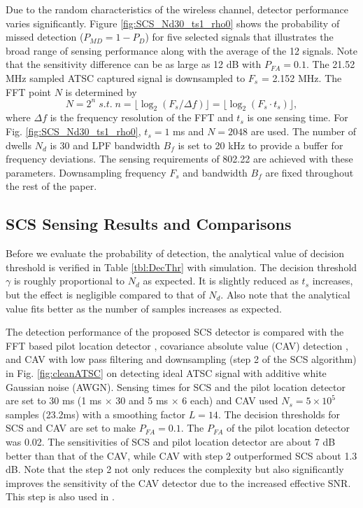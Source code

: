 \documentclass[draftclsnofoot,onecolumn,12pt]{IEEEtran}
\begin{document}
Due to the random
characteristics of the wireless channel, detector performance varies significantly.
Figure \ref{fig:SCS_Nd30_ts1_rho0} shows the probability of missed detection ($P_{MD} = 1 - P_D$) for five selected signals that illustrates the broad range of sensing performance along with the average of the 12 signals.
Note that the sensitivity difference
can be as large as 12 dB with $P_{FA} = 0.1$. The 21.52 MHz sampled ATSC captured signal is
downsampled to $F_s$ = 2.152 MHz. The FFT point $N$ is determined by
\begin{equation}
    N = 2^n \; s.t. \; n = \lfloor \log_2 (F_s/\Delta f) \rfloor = \lfloor \log_2 (F_s \cdot t_s)
    \rfloor, \label{eq:N}
\end{equation}
where $\Delta f$ is the frequency resolution of the FFT and $t_s$ is one sensing time.
For Fig.  \ref{fig:SCS_Nd30_ts1_rho0}, $t_s = 1$ ms and $N = 2048$ are used. The number of dwells $N_d$ is 30 and LPF bandwidth $B_f$ is set to 20 kHz to provide a buffer for
frequency deviations. The sensing requirements of 802.22 are achieved with these parameters.
Downsampling frequency $F_s$ and bandwidth $B_f$ are fixed throughout the rest of the paper.

\subsection{SCS Sensing Results and Comparisons}
\label{subsec:SimResults}


Before we evaluate the probability of detection, the analytical value of decision threshold is verified in Table \ref{tbl:DecThr} with simulation.
The decision threshold $\gamma$ is roughly proportional to $N_d$ as expected. It is slightly reduced as $t_s$ increases, but the effect is negligible compared to that of $N_d$. Also note that the analytical value fits better as the number of samples increases as expected.

The detection performance of the proposed SCS detector is compared with the FFT based pilot location detector \cite{CorGho07}, covariance absolute value (CAV) detection \cite{ZenLia09}, and CAV with low pass filtering and downsampling (step 2 of the SCS algorithm) in Fig. \ref{fig:cleanATSC} on detecting ideal ATSC signal with additive white Gaussian noise (AWGN). Sensing times for SCS and the pilot location detector are set to 30 ms (1 ms $\times$ 30 and 5 ms $\times$ 6 each) and CAV used  $N_s = 5\times10^5 $ samples (23.2ms) with a smoothing factor $L = 14$.
The decision thresholds for SCS and CAV are set to make $P_{FA} = 0.1$. The $P_{FA}$ of the pilot location detector was 0.02.
The sensitivities of SCS and pilot location detector are about 7 dB better than that of the CAV, while CAV with step 2
outperformed SCS about 1.3 dB. 
Note that the step 2 not only reduces the complexity but also significantly improves the sensitivity of the CAV detector due to the increased effective SNR. This step is also used in \cite{CorGho07}.
\end{document}
